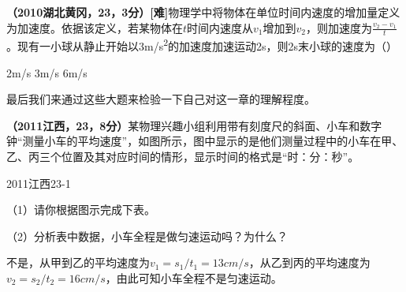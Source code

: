 \documentclass[12pt]{exam}%
\begin{document}
\begin{knowledge}
\textbf{（2010湖北黄冈，23，3分）[难]}物理学中将物体在单位时间内速度的增加量定义为加速度。依据该定义，若某物体在$t$时间内速度从$v_1$增加到$v_2$，则加速度为{\large $\frac{v_2-v_1}{t}$}。现有一小球从静止开始以3\si{m/s^2}的加速度加速运动2s，则2s末小球的速度为（\answerline*[D]）

\begin{oneparchoices}
\choice 2m/s
\choice 3m/s
\choice 6m/s
\end{oneparchoices}

最后我们来通过这些大题来检验一下自己对这一章的理解程度。

\textbf{（2011江西，23，8分）}某物理兴趣小组利用带有刻度尺的斜面、小车和数字钟“测量小车的平均速度”，如图所示，图中显示的是他们测量过程中的小车在甲、乙、丙三个位置及其对应时间的情形，显示时间的格式是“时：分：秒”。
\begin{linefig}{2011江西23-1}
\end{linefig}

（1）请你根据图示完成下表。

\begin{table}[H]
\end{table}

（2）分析表中数据，小车全程是做匀速运动吗？为什么？
\begin{solutionorbox}[12ex]
不是，从甲到乙的平均速度为$v_1=s_1/t_1=13cm/s$，从乙到丙的平均速度为$v_2=s_2/t_2=16cm/s$，由此可知小车全程不是匀速运动。
\end{solutionorbox}


\end{knowledge}
\end{document}
